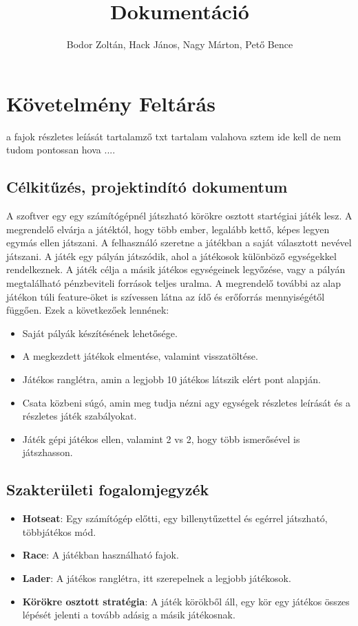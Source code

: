 \documentclass[a4paper,12pt]{report}
\title{Dokumentáció}
\author{Bodor Zoltán, Hack János, Nagy Márton, Pető Bence}
\begin{document}
\maketitle

%

\tableofcontents

\chapter{Követelmény Feltárás}

a fajok részletes leíását tartalamző txt tartalam valahova sztem ide kell de nem tudom pontossan hova ....

\section{Célkitűzés, projektindító dokumentum}

A szoftver egy egy számítógépnél játszható körökre osztott startégiai játék lesz. A megrendelő elvárja a játéktól, hogy több ember, legalább kettő, képes legyen egymás ellen játszani. A felhasználó
szeretne a játékban a saját választott nevével játszani. A játék egy pályán játszódik, ahol a játékosok különböző egységekkel rendelkeznek. A játék célja a másik játékos egységeinek legyőzése, vagy a pályán megtalálható pénzbeviteli források teljes uralma.
A megrendelő további az alap játékon túli feature-öket is szívessen látna az ídő és erőforrás mennyiségétől függően. Ezek a következőek lennének:
\begin{itemize}
\item Saját pályák készítésének lehetősége.
\item A megkezdett játékok elmentése, valamint visszatöltése.
\item Játékos ranglétra, amin a legjobb 10 játékos látszik elért pont alapján.
\item Csata közbeni súgó, amin meg tudja nézni agy egységek részletes leírását és a részletes játék szabályokat.
\item Játék gépi játékos ellen, valamint 2 vs 2, hogy több ismerősével is játszhasson.
\end{itemize} 

\section{Szakterületi fogalomjegyzék}

\begin{itemize}
\item {\bf Hotseat}: Egy számítógép előtti, egy billenytűzettel és egérrel játszható, többjátékos mód.
\item {\bf Race}: A játékban használható fajok.
\item {\bf Lader}: A játékos ranglétra, itt szerepelnek a legjobb játékosok.
\item {\bf Körökre osztott stratégia}: A játék körökből áll, egy kör egy játékos összes lépését jelenti a tovább adásig a másik játékosnak.
\end{itemize}
\end{document}
